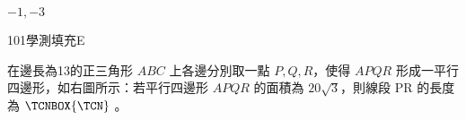 \begin{QUESTIONS}
\begin{QUESTION}
        \begin{QTAGS}\end{QTAGS}
        \begin{QANS}
            $-1,-3$
        \end{QANS}
        \begin{QSOLLIST}
        \end{QSOLLIST}
        \begin{QEMPTYSPACE}
        \end{QEMPTYSPACE}
    \end{QUESTION}
    \begin{QUESTION}
        \begin{ExamInfo}{101}{學測}{填充}{E}
        \end{ExamInfo}
        \begin{ExamAnsRateInfo}{46}{85}{39}{14}
        \end{ExamAnsRateInfo}
        \begin{QBODY}
            在邊長為13的正三角形 $ABC$ 上各邊分別取一點 $P,Q,R$，使得 $APQR$ 形成一平行四邊形，如右圖所示：若平行四邊形 $APQR$ 的面積為 $20\sqrt{3}$，則線段 PR 的長度為 $\TCNBOX{\TCN}$ 。
			

\end{QBODY}
\end{QUESTION}
\end{QUESTIONS}
